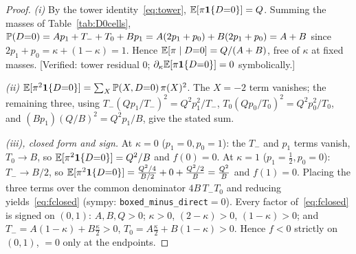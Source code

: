 \begin{proof}
\emph{(i)} By the tower identity~\eqref{eq:tower}, $\mathbb{E}[\pi\mathbf{1}\{D{=}0\}]=Q$.
Summing the masses of Table~\ref{tab:D0cells},
$\mathbb{P}(D{=}0)=A p_1+T_-+T_0+B p_1=A(2p_1+p_0)+B(2p_1+p_0)=A+B$ since
$2p_1+p_0=\kappa+(1-\kappa)=1$. Hence $\mathbb{E}[\pi\mid D{=}0]=Q/(A+B)$, free of $\kappa$
at fixed masses. [Verified: tower residual $0$; $\partial_\kappa\mathbb{E}[\pi\mathbf{1}\{D{=}0\}]=0$
symbolically.]

\emph{(ii)} $\mathbb{E}[\pi^2\mathbf{1}\{D{=}0\}]=\sum_X\mathbb{P}(X,D{=}0)\,\pi(X)^2$. The $X{=}{-}2$ term
vanishes; the remaining three, using $T_-(Q p_1/T_-)^2=Q^2p_1^2/T_-$,
$T_0(Q p_0/T_0)^2=Q^2p_0^2/T_0$, and $(Bp_1)(Q/B)^2=Q^2p_1/B$, give the stated sum.

\emph{(iii), closed form and sign.} At $\kappa=0$ ($p_1=0,p_0=1$): the $T_-$ and
$p_1$ terms vanish, $T_0\to B$, so $\mathbb{E}[\pi^2\mathbf{1}\{D{=}0\}]=Q^2/B$ and $f(0)=0$. At
$\kappa=1$ ($p_1=\tfrac12,p_0=0$): $T_-\to B/2$, so
$\mathbb{E}[\pi^2\mathbf{1}\{D{=}0\}]=\tfrac{Q^2/4}{B/2}+0+\tfrac{Q^2/2}{B}=\tfrac{Q^2}{B}$ and
$f(1)=0$. Placing the three terms over the common denominator $4 B\,T_-T_0$ and
reducing yields~\eqref{eq:fclosed} (sympy: \texttt{boxed\_minus\_direct}$=0$).
Every factor of~\eqref{eq:fclosed} is signed on $(0,1)$: $A,B,Q>0$; $\kappa>0$,
$(2-\kappa)>0$, $(1-\kappa)>0$; and $T_-=A(1-\kappa)+B\tfrac\kappa2>0$,
$T_0=A\tfrac\kappa2+B(1-\kappa)>0$. Hence $f<0$ strictly on $(0,1)$, $=0$ only at
the endpoints.


\end{proof}
